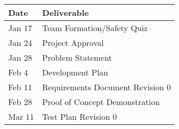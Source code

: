 \documentclass{article}
\begin{document}
    \begin{table}[!ht]
        \begin{tabular}{|l|l|}
        \hline
         Date & Deliverable \\
        \hline
         Jan 17 & Team Formation/Safety Quiz \\
        \hline
         Jan 24 & Project Approval \\
         \hline
         Jan 28 & Problem Statement \\
         \hline
         Feb 4 & Development Plan \\
         \hline
         Feb 11 & Requirements Document Revision 0 \\
         \hline
         Feb 28 & Proof of Concept Demonstration \\
         \hline
         Mar 11 & Test Plan Revision 0 \\
         \hline
        \end{tabular}
    \end{table}
\end{document}
